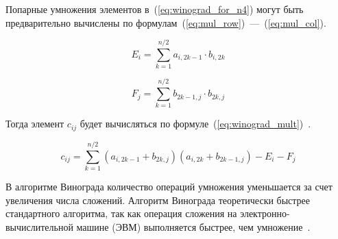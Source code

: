 Попарные умножения элементов в~(\ref{eq:winograd_for_n4}) могут быть предварительно вычислены по формулам~(\ref{eq:mul_row})~---~(\ref{eq:mul_col}).

\begin{equation}
    \label{eq:mul_row}
    E_i = \sum_{k=1}^{n/2} a_{i, 2k - 1} \cdot b_{i,2k} 
\end{equation}

\begin{equation}
    \label{eq:mul_col}
    F_j = \sum_{k=1}^{n/2} b_{2k - 1, j} \cdot b_{2k,j} 
\end{equation}

Тогда элемент $c_{ij}$ будет вычисляться по формуле~(\ref{eq:winograd_mult})~\cite{winograd}.

\begin{equation}
    \label{eq:winograd_mult}
    c_{ij} = \sum_{k=1}^{n/2} (a_{i, 2k-1} + b_{2k,j}) (a_{i, 2k} + b_{2k-1,j}) - E_i - F_j
\end{equation}

В алгоритме Винограда количество операций умножения уменьшается за счет увеличения числа сложений. Алгоритм Винограда теоретически быстрее стандартного алгоритма, так как операция сложения на электронно-вычислительной машине (ЭВМ) выполняется быстрее, чем умножение~\cite{winograd}.